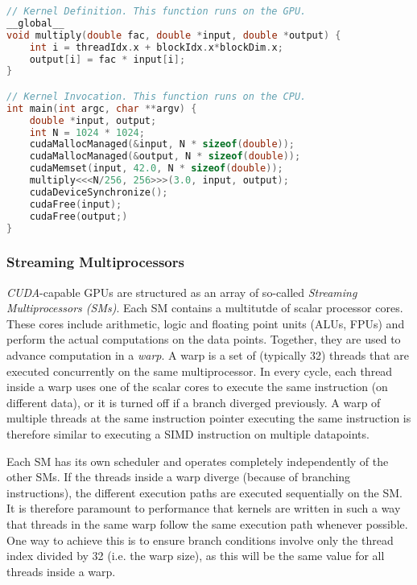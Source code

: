 \begin{lstfloat}
\begin{lstlisting}[caption={Example showing kernel, its launch and CUDA API calls for allocating unified memory},captionpos=b,language=C]
// Kernel Definition. This function runs on the GPU.
__global__
void multiply(double fac, double *input, double *output) {
	int i = threadIdx.x + blockIdx.x*blockDim.x;
	output[i] = fac * input[i];
}

// Kernel Invocation. This function runs on the CPU.
int main(int argc, char **argv) {
	double *input, output;
	int N = 1024 * 1024;
	cudaMallocManaged(&input, N * sizeof(double));
	cudaMallocManaged(&output, N * sizeof(double));
	cudaMemset(input, 42.0, N * sizeof(double));
	multiply<<<N/256, 256>>>(3.0, input, output);
	cudaDeviceSynchronize();
	cudaFree(input);
	cudaFree(output;)
}
\end{lstlisting}
\end{lstfloat}

\subsubsection{Streaming Multiprocessors} \label{sec:hardware}

\emph{CUDA}-capable GPUs are structured as an array of so-called \emph{Streaming Multiprocessors (SMs)}. Each SM contains a multitutde of scalar processor cores. These cores include arithmetic, logic and floating point units (ALUs, FPUs) and perform the actual computations on the data points. Together, they are used to advance computation in a \emph{warp}. A warp is a set of (typically 32) threads that are executed concurrently on the same multiprocessor. In every cycle, each thread inside a warp uses one of the scalar cores to execute the same instruction (on different data), or it is turned off if a branch diverged previously. A warp of multiple threads at the same instruction pointer executing the same instruction is therefore similar to executing a SIMD instruction on multiple datapoints.

Each SM has its own scheduler and operates completely independently of the other SMs. If the threads inside a warp diverge (because of branching instructions), the different execution paths are executed sequentially on the SM. It is therefore paramount to performance that kernels are written in such a way that threads in the same warp follow the same execution path whenever possible. One way to achieve this is to ensure branch conditions involve only the thread index divided by 32 (i.e. the warp size), as this will be the same value for all threads inside a warp. 


